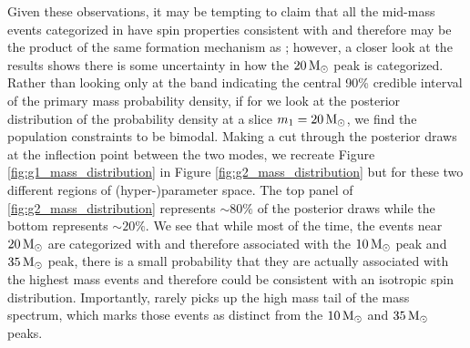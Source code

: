 
Given these observations, it may be tempting to claim that all the mid-mass events categorized in \contA{} have spin properties consistent with \first{} and therefore may be the product of the same formation mechanism as \first{}; however, a closer look at the results shows there is some uncertainty in how the $20 {\,\rm M}_\odot$ peak is categorized. Rather than looking only at the band indicating the central 90\% credible interval of the primary mass probability density, if for \contB{} we look at the posterior distribution of the probability density at a slice $m_1 = 20 {\,\rm M}_\odot$, we find the population constraints to be bimodal. Making a cut through the posterior draws at the inflection point between the two modes, we recreate Figure \ref{fig:g1_mass_distribution} in Figure \ref{fig:g2_mass_distribution} but for these two different regions of (hyper-)parameter space. The top panel of \ref{fig:g2_mass_distribution} represents $\sim80\%$ of the posterior draws while the bottom represents $\sim20\%$. We see that while most of the time, the events near $20{\,\rm M}_\odot$ are categorized with \contA{} and therefore associated with the $10{\,\rm M}_\odot$ peak and $35{\,\rm M}_\odot$ peak, there is a small probability that they are actually associated with the highest mass events and therefore could be consistent with an isotropic spin distribution. Importantly, \contA{} rarely picks up the high mass tail of the mass spectrum, which marks those events as distinct from the $10{\,\rm M}_\odot$ and $35{\,\rm M}_\odot$ peaks.

